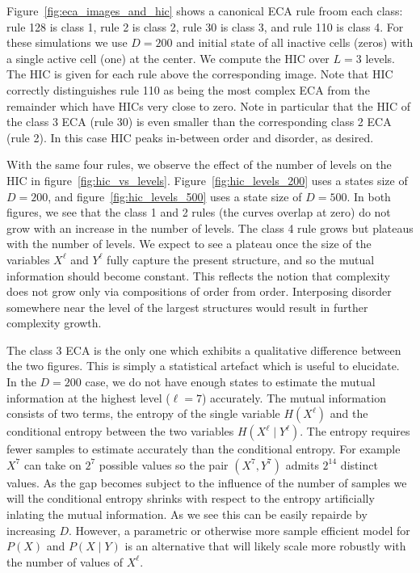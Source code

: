 Figure~\ref{fig:eca_images_and_hic} shows a canonical ECA rule froom each
class: rule 128 is class 1, rule 2 is class 2, rule 30 is class 3, and rule 110
is class 4. For these simulations we use $D=200$ and initial state of all
inactive cells (zeros) with a single active cell (one) at the center. We
compute the HIC over $L=3$ levels. The HIC is given for each rule above the
corresponding image. Note that HIC correctly distinguishes rule 110 as being
the most complex ECA from the remainder which have HICs very close to zero.
Note in particular that the HIC of the class 3 ECA (rule 30) is even smaller
than the corresponding class 2 ECA (rule 2). In this case HIC peaks in-between
order and disorder, as desired.

With the same four rules, we observe the effect of the number of levels on the
HIC in figure~\ref{fig:hic_vs_levels}. Figure~\ref{fig:hic_levels_200} uses a
states size of $D=200$, and figure~\ref{fig:hic_levels_500} uses a state size
of $D=500$. In both figures, we see that the class 1 and 2 rules (the curves
overlap at zero) do not grow with an increase in the number of levels. The
class 4 rule grows but plateaus with the number of levels. We expect to see a
plateau once the size of the variables $X^\ell$ and $Y^\ell$ fully capture the
present structure, and so the mutual information should become constant. This
reflects the notion that complexity does not grow only via compositions of
order from order. Interposing disorder somewhere near the level of the largest
structures would result in further complexity growth.

The class 3 ECA is the only one which exhibits a qualitative difference between
the two figures. This is simply a statistical artefact which is useful to
elucidate. In the $D=200$ case, we do not have enough states to estimate the
mutual information at the highest level ($\ell = 7$) accurately. The mutual
information consists of two terms, the entropy of the single variable
$H(X^\ell)$ and the conditional entropy between the two variables $H(X^\ell
\mid Y^\ell)$. The entropy requires fewer samples to estimate accurately than
the conditional entropy. For example $X^7$ can take on $2^7$ possible values so
the pair $(X^7, Y^7)$ admits $2^14$ distinct values. As the gap becomes subject
to the influence of the number of samples we will the conditional entropy
shrinks with respect to the entropy artificially inlating the mutual
information. As we see this can be easily repairde by increasing $D$. However,
a parametric or otherwise more sample efficient model for $P(X)$ and $P(X \mid
Y)$ is an alternative that will likely scale more robustly with the number
of values of $X^\ell$.


